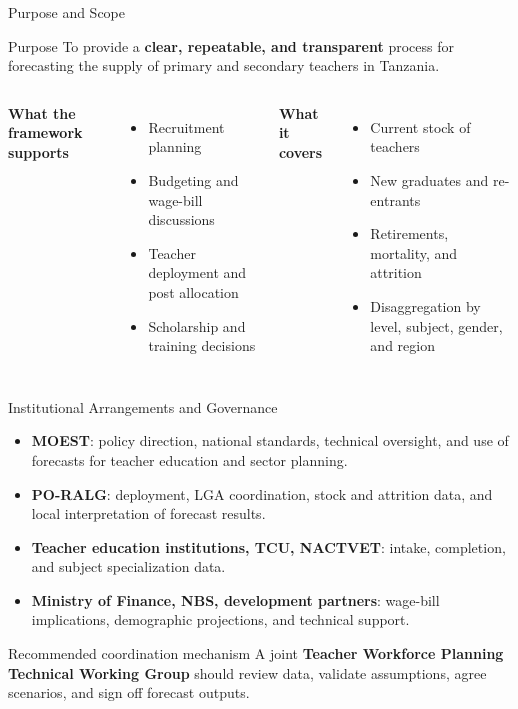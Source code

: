 \documentclass[aspectratio=169,11pt]{beamer}
\newcommand{\highlight}[1]{\textcolor{DavidsonBlueDark}{\textbf{#1}}}
\begin{document}
\begin{frame}{Purpose and Scope}
\begin{block}{Purpose}
\justifying
To provide a \highlight{clear, repeatable, and transparent} process for forecasting the supply of primary and secondary teachers in Tanzania.
\end{block}
\vspace{0.15cm}
\begin{columns}[T,onlytextwidth]
\textbf{What the framework supports}
\begin{itemize}
  \item Recruitment planning
  \item Budgeting and wage-bill discussions
  \item Teacher deployment and post allocation
  \item Scholarship and training decisions
\end{itemize}
\textbf{What it covers}
\begin{itemize}
  \item Current stock of teachers
  \item New graduates and re-entrants
  \item Retirements, mortality, and attrition
  \item Disaggregation by level, subject, gender, and region
\end{itemize}
\end{columns}
\end{frame}


\begin{frame}{Institutional Arrangements and Governance}
\begin{itemize}
  \item \highlight{MOEST}: policy direction, national standards, technical oversight, and use of forecasts for teacher education and sector planning.
  \item \highlight{PO-RALG}: deployment, LGA coordination, stock and attrition data, and local interpretation of forecast results.
  \item \highlight{Teacher education institutions, TCU, NACTVET}: intake, completion, and subject specialization data.
  \item \highlight{Ministry of Finance, NBS, development partners}: wage-bill implications, demographic projections, and technical support.
\end{itemize}
\vspace{0.25cm}
\begin{block}{Recommended coordination mechanism}
A joint \highlight{Teacher Workforce Planning Technical Working Group} should review data, validate assumptions, agree scenarios, and sign off forecast outputs.
\end{block}
\end{frame}
\end{document}
